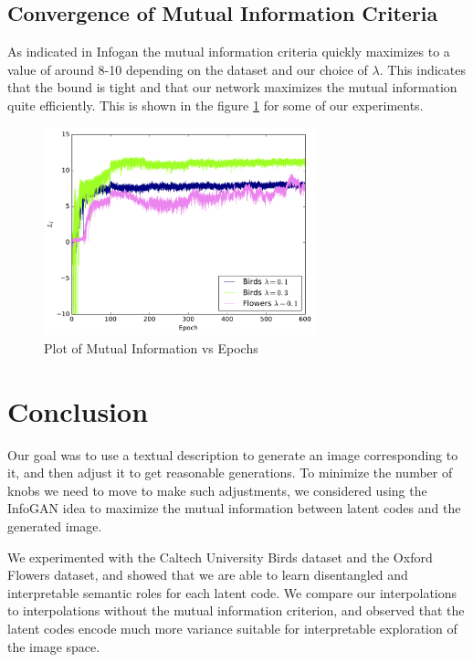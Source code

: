 \documentclass{article}
\begin{document}
\subsection{Convergence of Mutual Information Criteria}
As indicated in Infogan \cite{infogan} the mutual information criteria quickly maximizes to
a value of around 8-10 depending on the dataset and our choice of $\lambda$.
This indicates that the bound is tight and that our network maximizes the mutual
information quite efficiently. This is shown in the figure \ref{fig:miplot} for some of our
experiments.
\begin{figure}
\centering
\includegraphics[width=0.7\textwidth]{miplot}
\caption{Plot of Mutual Information vs Epochs}
\label{fig:miplot}
\end{figure}
\section{Conclusion}

Our goal was to use a textual description to generate an image corresponding to it, and then adjust it to get reasonable generations. To minimize the number of knobs we need to move to make such adjustments, we considered using the InfoGAN idea to maximize the mutual information between latent codes and the generated image.

We experimented with the Caltech University Birds dataset and the Oxford Flowers dataset, and showed that we are able to learn disentangled and interpretable semantic roles for each latent code. We compare our interpolations to interpolations without the mutual information criterion, and observed that the latent codes encode much more variance suitable for interpretable exploration of the image space.
\end{document}
